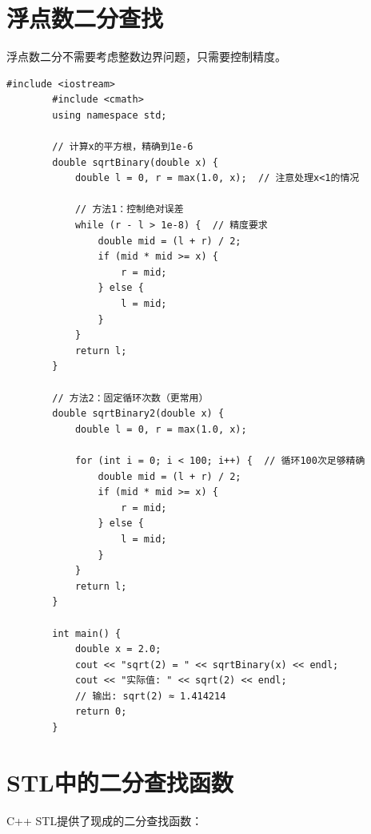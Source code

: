 \documentclass[12pt,a4paper]{article}
\begin{document}
	\section{浮点数二分查找}
	
	浮点数二分不需要考虑整数边界问题，只需要控制精度。
	
	\begin{lstlisting}[caption={浮点数二分：求平方根}]
		#include <iostream>
		#include <cmath>
		using namespace std;
		
		// 计算x的平方根，精确到1e-6
		double sqrtBinary(double x) {
			double l = 0, r = max(1.0, x);  // 注意处理x<1的情况
			
			// 方法1：控制绝对误差
			while (r - l > 1e-8) {  // 精度要求
				double mid = (l + r) / 2;
				if (mid * mid >= x) {
					r = mid;
				} else {
					l = mid;
				}
			}
			return l;
		}
		
		// 方法2：固定循环次数（更常用）
		double sqrtBinary2(double x) {
			double l = 0, r = max(1.0, x);
			
			for (int i = 0; i < 100; i++) {  // 循环100次足够精确
				double mid = (l + r) / 2;
				if (mid * mid >= x) {
					r = mid;
				} else {
					l = mid;
				}
			}
			return l;
		}
		
		int main() {
			double x = 2.0;
			cout << "sqrt(2) = " << sqrtBinary(x) << endl;
			cout << "实际值: " << sqrt(2) << endl;
			// 输出: sqrt(2) ≈ 1.414214
			return 0;
		}
	\end{lstlisting}
	
	\section{STL中的二分查找函数}
	
	C++ STL提供了现成的二分查找函数：
	
\end{document}
